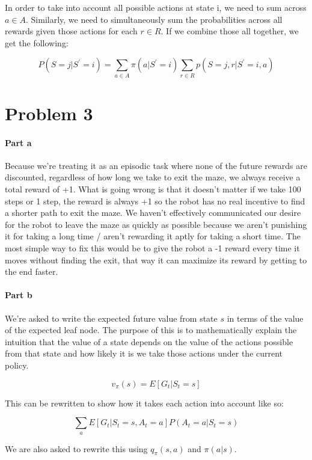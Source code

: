 \documentclass[12pt]{article}
\begin{document}
In order to take into account all possible actions at state i, we need to sum across $a \in A$. Similarly, we need to simultaneously sum the probabilities across all rewards given those actions for each $r \in R$. If we combine those all together, we get the following:

$$
  P(S = j | S^\prime = i) = \sum_{a \in A} \pi(a|S^\prime=i) \sum_{r \in R} p(S = j, r | S^\prime = i, a)
$$

\section{Problem 3}

\paragraph{Part a} Because we're treating it as an episodic task where none of the future rewards are discounted, regardless of how long we take to exit the maze, we always receive a total reward of +1. What is going wrong is that it doesn't matter if we take 100 steps or 1 step, the reward is always +1 so the robot has no real incentive to find a shorter path to exit the maze. We haven't effectively communicated our desire for the robot to leave the maze as quickly as possible because we aren't punishing it for taking a long time / aren't rewarding it aptly for taking a short time. The most simple way to fix this would be to give the robot a -1 reward every time it moves without finding the exit, that way it can maximize its reward by getting to the end faster.

\paragraph{Part b} We're asked to write the expected future value from state $s$ in terms of the value of the expected leaf node. The purpose of this is to mathematically explain the intuition that the value of a state depends on the value of the actions possible from that state and how likely it is we take those actions under the current policy.

$$
  v_\pi(s) = E[G_{t} | S_t = s]
$$

This can be rewritten to show how it takes each action into account like so:

$$
  \sum_a E[G_t | S_t = s, A_t = a]P(A_t = a | S_t = s)
$$

We are also asked to rewrite this using $q_\pi(s, a)$ and $\pi(a|s)$.
\end{document}
